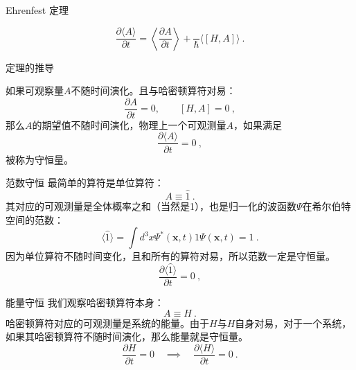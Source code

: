 

\begin{theorem}{Ehrenfest 定理}
\end{theorem}
\begin{equation}
\frac{\partial\langle A\rangle}{\partial t}=\left\langle\frac{\partial A}{\partial t}\right\rangle+\frac{}{\hbar}\langle[H, A]\rangle~.
\end{equation}
\begin{issues}
\issueTODO 定理的推导
\end{issues}

如果可观察量$A$不随时间演化。且与哈密顿算符对易：
\begin{equation}
\frac{\partial A}{\partial t}=0,\qquad[H, A]=0~,
\end{equation}
那么$A$的期望值不随时间演化，物理上一个可观测量$A$，如果满足
\begin{equation}
\frac{\partial\langle A\rangle}{\partial t}=0~,
\end{equation}
被称为守恒量。
\begin{example}{范数守恒}
最简单的算符是单位算符：
\begin{equation}
A\equiv \hat 1~.
\end{equation}
其对应的可观测量是全体概率之和（当然是1），也是归一化的波函数$\Psi$在希尔伯特空间的范数：
\begin{equation}
\langle\hat{1}\rangle=\int d^{3}x \Psi^{*}(\boldsymbol{x}, t) 1 \Psi(\boldsymbol{x}, t)=1~.
\end{equation}
因为单位算符不随时间变化，且和所有的算符对易，所以范数一定是守恒量。
\begin{equation}
\frac{\partial\langle \hat 1\rangle}{\partial t}=0~,
\end{equation}
\end{example}
\begin{example}{能量守恒}
我们观察哈密顿算符本身：
\begin{equation}
A\equiv H~.
\end{equation}
哈密顿算符对应的可观测量是系统的能量。由于$H$与$H$自身对易，对于一个系统，如果其哈密顿算符不随时间演化，那么能量就是守恒量。
\begin{equation}
\frac{\partial H}{\partial t}=0 \quad\implies\quad \frac{\partial\langle H\rangle}{\partial t}=0~.
\end{equation}
\end{example}
